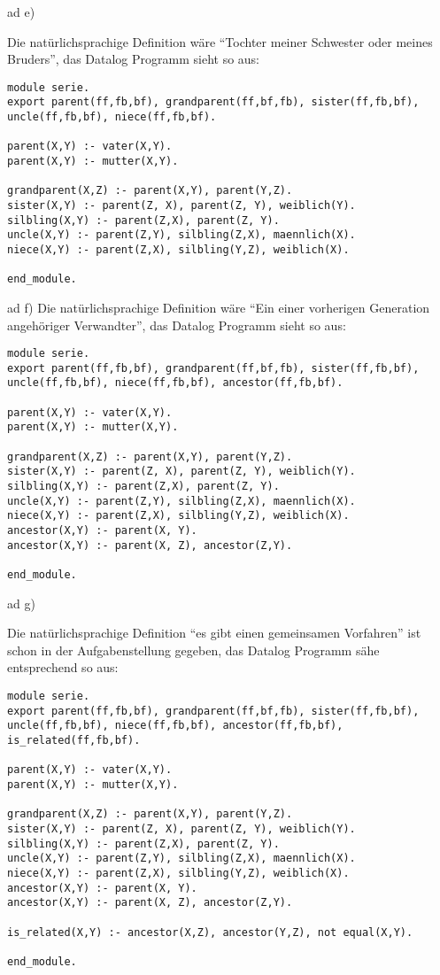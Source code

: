 \documentclass[12pt,a4paper]{amsart}
\begin{document}
\medskip

ad e)

Die natürlichsprachige Definition wäre ``Tochter meiner Schwester oder meines Bruders'', das Datalog Programm sieht so aus:

\begin{lstlisting}
module serie.
export parent(ff,fb,bf), grandparent(ff,bf,fb), sister(ff,fb,bf), uncle(ff,fb,bf), niece(ff,fb,bf).

parent(X,Y) :- vater(X,Y).
parent(X,Y) :- mutter(X,Y).

grandparent(X,Z) :- parent(X,Y), parent(Y,Z).
sister(X,Y) :- parent(Z, X), parent(Z, Y), weiblich(Y).
silbling(X,Y) :- parent(Z,X), parent(Z, Y).
uncle(X,Y) :- parent(Z,Y), silbling(Z,X), maennlich(X).
niece(X,Y) :- parent(Z,X), silbling(Y,Z), weiblich(X).

end_module.
\end{lstlisting}

\medskip

ad f)
Die natürlichsprachige Definition wäre ``Ein einer vorherigen Generation angehöriger Verwandter'', das Datalog Programm sieht so aus:

\begin{lstlisting}
module serie.
export parent(ff,fb,bf), grandparent(ff,bf,fb), sister(ff,fb,bf), uncle(ff,fb,bf), niece(ff,fb,bf), ancestor(ff,fb,bf).

parent(X,Y) :- vater(X,Y).
parent(X,Y) :- mutter(X,Y).

grandparent(X,Z) :- parent(X,Y), parent(Y,Z).
sister(X,Y) :- parent(Z, X), parent(Z, Y), weiblich(Y).
silbling(X,Y) :- parent(Z,X), parent(Z, Y).
uncle(X,Y) :- parent(Z,Y), silbling(Z,X), maennlich(X).
niece(X,Y) :- parent(Z,X), silbling(Y,Z), weiblich(X).
ancestor(X,Y) :- parent(X, Y).
ancestor(X,Y) :- parent(X, Z), ancestor(Z,Y).

end_module.
\end{lstlisting}

\medskip

ad g)

Die natürlichsprachige Definition ``es gibt einen gemeinsamen Vorfahren'' ist schon in der Aufgabenstellung gegeben, das Datalog Programm sähe entsprechend so aus:

\begin{lstlisting}
module serie.
export parent(ff,fb,bf), grandparent(ff,bf,fb), sister(ff,fb,bf), uncle(ff,fb,bf), niece(ff,fb,bf), ancestor(ff,fb,bf), is_related(ff,fb,bf).

parent(X,Y) :- vater(X,Y).
parent(X,Y) :- mutter(X,Y).

grandparent(X,Z) :- parent(X,Y), parent(Y,Z).
sister(X,Y) :- parent(Z, X), parent(Z, Y), weiblich(Y).
silbling(X,Y) :- parent(Z,X), parent(Z, Y).
uncle(X,Y) :- parent(Z,Y), silbling(Z,X), maennlich(X).
niece(X,Y) :- parent(Z,X), silbling(Y,Z), weiblich(X).
ancestor(X,Y) :- parent(X, Y).
ancestor(X,Y) :- parent(X, Z), ancestor(Z,Y).

is_related(X,Y) :- ancestor(X,Z), ancestor(Y,Z), not equal(X,Y).

end_module.
\end{lstlisting}
\end{document}
